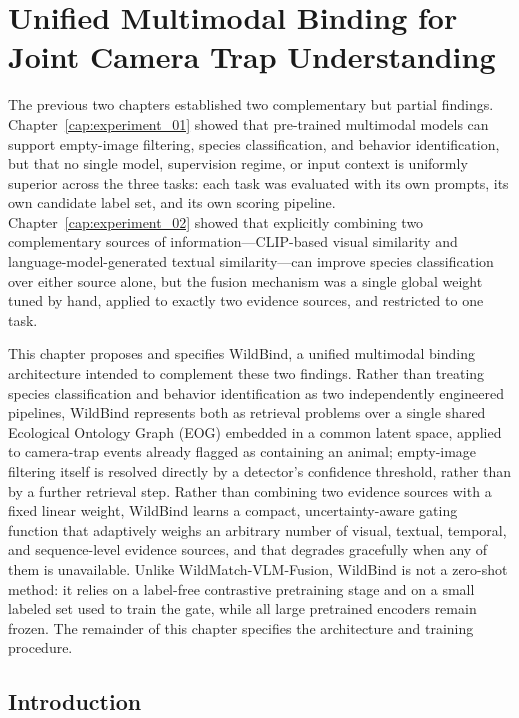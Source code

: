 \chapter{Unified Multimodal Binding for Joint Camera Trap Understanding}\label{cap:experiment_03}

The previous two chapters established two complementary but partial findings. Chapter~\ref{cap:experiment_01} showed that pre-trained multimodal models can support empty-image filtering, species classification, and behavior identification, but that no single model, supervision regime, or input context is uniformly superior across the three tasks: each task was evaluated with its own prompts, its own candidate label set, and its own scoring pipeline. Chapter~\ref{cap:experiment_02} showed that explicitly combining two complementary sources of information---CLIP-based visual similarity and language-model-generated textual similarity---can improve species classification over either source alone, but the fusion mechanism was a single global weight tuned by hand, applied to exactly two evidence sources, and restricted to one task.

This chapter proposes and specifies WildBind, a unified multimodal binding architecture intended to complement these two findings. Rather than treating species classification and behavior identification as two independently engineered pipelines, WildBind represents both as retrieval problems over a single shared Ecological Ontology Graph (EOG) embedded in a common latent space, applied to camera-trap events already flagged as containing an animal; empty-image filtering itself is resolved directly by a detector's confidence threshold, rather than by a further retrieval step. Rather than combining two evidence sources with a fixed linear weight, WildBind learns a compact, uncertainty-aware gating function that adaptively weighs an arbitrary number of visual, textual, temporal, and sequence-level evidence sources, and that degrades gracefully when any of them is unavailable. Unlike WildMatch-VLM-Fusion, WildBind is not a zero-shot method: it relies on a label-free contrastive pretraining stage and on a small labeled set used to train the gate, while all large pretrained encoders remain frozen. The remainder of this chapter specifies the architecture and training procedure.

\section{Introduction}

